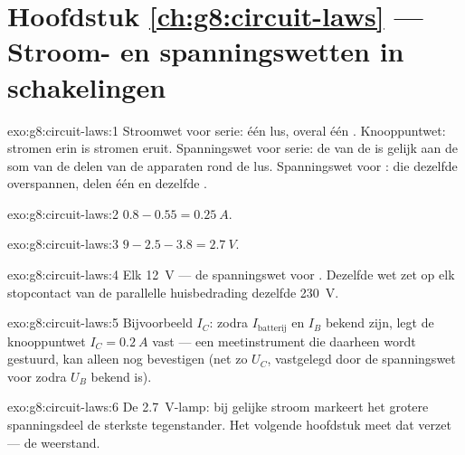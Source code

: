 \section*{Hoofdstuk \ref{ch:g8:circuit-laws} --- Stroom- en spanningswetten in schakelingen}

\begin{solution}{exo:g8:circuit-laws:1}
Stroomwet voor serie: één lus, overal één
. Knooppuntwet: stromen erin is
stromen eruit. Spanningswet voor serie: de  van de
 is gelijk aan de som van de delen van de apparaten rond
de lus. Spanningswet voor :  die dezelfde
 overspannen, delen één en dezelfde
.
\end{solution}

\begin{solution}{exo:g8:circuit-laws:2}
$0.8 - 0.55 = \qty{0.25}{A}$.
\end{solution}

\begin{solution}{exo:g8:circuit-laws:3}
$9 - 2.5 - 3.8 = \qty{2.7}{V}$.
\end{solution}

\begin{solution}{exo:g8:circuit-laws:4}
Elk \qty{12}{V} --- de spanningswet voor . Dezelfde wet zet op
elk stopcontact van de parallelle huisbedrading dezelfde \qty{230}{V}.
\end{solution}

\begin{solution}{exo:g8:circuit-laws:5}
Bijvoorbeeld $I_C$: zodra $I_{\text{batterij}}$ en $I_B$ bekend zijn,
legt de knooppuntwet $I_C = \qty{0.2}{A}$ vast --- een meetinstrument
die daarheen wordt gestuurd, kan alleen nog bevestigen (net zo $U_C$,
vastgelegd door de spanningswet voor  zodra $U_B$ bekend is).
\end{solution}

\begin{solution}{exo:g8:circuit-laws:6}
De \qty{2.7}{V}-lamp: bij gelijke stroom markeert het grotere
spanningsdeel de sterkste tegenstander. Het volgende hoofdstuk
meet dat verzet --- de weerstand.
\end{solution}

